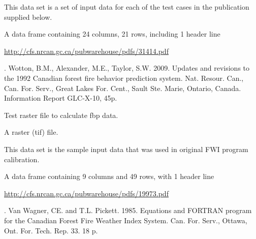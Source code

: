 \documentclass[a4paper]{book}
\begin{document}
%
\begin{Description}\relax
This data set is a set of input data for each of the test cases in the
publication supplied below.
\end{Description}
%
\begin{Format}
A data frame containing 24 columns, 21 rows, including 1 header line
\end{Format}
%
\begin{Source}\relax
\url{http://cfs.nrcan.gc.ca/pubwarehouse/pdfs/31414.pdf}
\end{Source}
%
\begin{References}. Wotton, B.M., Alexander, M.E., Taylor, S.W. 2009. Updates and
revisions to the 1992 Canadian forest fire behavior prediction system. Nat.
Resour. Can., Can. For. Serv., Great Lakes For. Cent., Sault Ste. Marie,
Ontario, Canada. Information Report GLC-X-10, 45p.
\end{References}
%
\begin{Description}\relax
Test raster file to calculate fbp data.
\end{Description}
%
\begin{Format}
A raster (tif) file.
\end{Format}
%
\begin{Description}\relax
This data set is the sample input data that was used in original FWI program
calibration.
\end{Description}
%
\begin{Format}
A data frame containing 9 columns and 49 rows, with 1 header line
\end{Format}
%
\begin{Source}\relax
\url{http://cfs.nrcan.gc.ca/pubwarehouse/pdfs/19973.pdf}
\end{Source}
%
\begin{References}. Van Wagner, CE. and T.L. Pickett. 1985. Equations and FORTRAN
program for the Canadian Forest Fire Weather Index System. Can. For. Serv.,
Ottawa, Ont. For. Tech. Rep. 33. 18 p.
\end{References}
\end{document}
